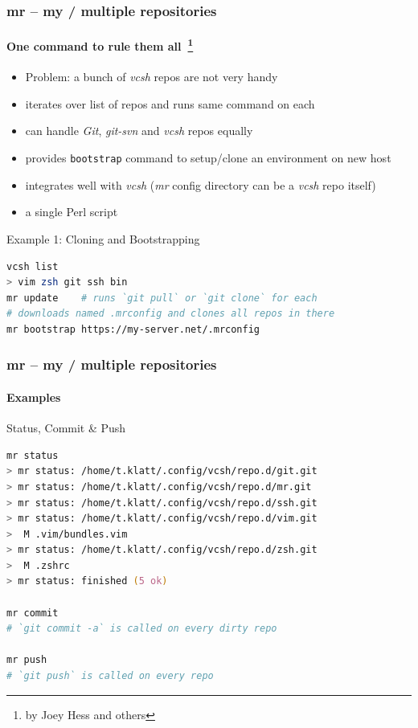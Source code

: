 \documentclass[english,hyperref={pdfpagelabels=false},aspectratio=1610]{beamer}
\begin{document}
\begin{frame}[label=mr,fragile]
  \frametitle{mr -- my / multiple repositories}
  \framesubtitle{One command to rule them all~\footnote{\tiny by Joey Hess and others}}
  \begin{itemize}
    \item Problem: a bunch of \textit{vcsh} repos are not very handy
    \item iterates over list of repos and runs same command on each
    \item can handle \emph{Git}, \emph{git-svn} and \emph{vcsh} repos equally
    \item provides \texttt{bootstrap} command to setup/clone an environment on new host
    \item integrates well with \textit{vcsh} {\scriptsize\color{fzjgray50}(\textit{mr} config directory can be a \textit{vcsh} repo itself)}
    \item a single Perl script
  \end{itemize}
  \begin{block}{Example 1: Cloning and Bootstrapping}
    \vspace{-0.75em}
    \begin{lstlisting}[language=zsh]
vcsh list
> vim zsh git ssh bin
mr update    # runs `git pull` or `git clone` for each
# downloads named .mrconfig and clones all repos in there
mr bootstrap https://my-server.net/.mrconfig
    \end{lstlisting}
    \vspace{-0.75em}
  \end{block}
\end{frame}

\begin{frame}[fragile]
  \frametitle{mr -- my / multiple repositories}
  \framesubtitle{Examples}
  \begin{block}{Status, Commit \& Push}
    \vspace{-0.75em}
    \begin{lstlisting}[language=zsh]
mr status
> mr status: /home/t.klatt/.config/vcsh/repo.d/git.git
> mr status: /home/t.klatt/.config/vcsh/repo.d/mr.git
> mr status: /home/t.klatt/.config/vcsh/repo.d/ssh.git
> mr status: /home/t.klatt/.config/vcsh/repo.d/vim.git
>  M .vim/bundles.vim
> mr status: /home/t.klatt/.config/vcsh/repo.d/zsh.git
>  M .zshrc
> mr status: finished (5 ok)

mr commit
# `git commit -a` is called on every dirty repo

mr push
# `git push` is called on every repo
    \end{lstlisting}
    \vspace{-0.75em}
  \end{block}
\end{frame}
\end{document}
